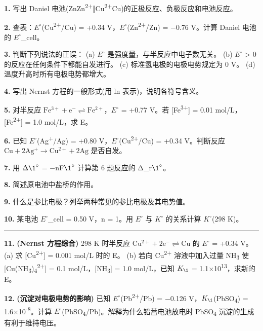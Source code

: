 \documentclass[a4paper,11pt]{ctexart}
\newcommand{\箭}{\ensuremath{\rightarrow}}
\newcommand{\左箭}{\ensuremath{\leftarrow}}
\newcommand{\上箭}{\ensuremath{\uparrow}}
\newcommand{\下箭}{\ensuremath{\downarrow}}
\newcommand{\衡}{\ensuremath{\rightleftharpoons}}
\newcommand{\双箭}{\ensuremath{\leftrightarrow}}
\newcommand{\约等于}{\ensuremath{\approx}}
\newcommand{\小于等于}{\ensuremath{\leq}}
\newcommand{\大于等于}{\ensuremath{\geq}}
\newcommand{\不等于}{\ensuremath{\neq}}
\newcommand{\西格马}{\ensuremath{\sigma}}
\newcommand{\派}{\ensuremath{\pi}}
\begin{document}
\textbf{1.} 写出 Daniel 电池(Zn\textbar Zn\textsuperscript{2+}‖Cu\textsuperscript{2+}\textbar Cu)的正极反应、负极反应和电池反应。

\textbf{2.} 查表：\(E^{\circ}\)(Cu\textsuperscript{2+}/Cu) = +0.34 V，\(E^{\circ}\)(Zn\textsuperscript{2+}/Zn) = −0.76 V。计算 Daniel 电池的 \(E^{\circ}\)\_cell。

\textbf{3.} 判断下列说法的正误：
(a) \(E^{\circ}\) 是强度量，与半反应中电子数无关。
(b) \(E^{\circ}\) \textgreater{} 0 的反应在任何条件下都能自发进行。
(c) 标准氢电极的电极电势规定为 0 V。
(d) 温度升高时所有电极电势都增大。

\textbf{4.} 写出 Nernst 方程的一般形式(用 ln 表示)，说明各符号含义。

\textbf{5.} 对半反应 \(\mathrm{Fe^{3+} + e^- \rightleftharpoons Fe^{2+}}\)，\(E^{\circ}\) = +0.77 V。若 {[}Fe\textsuperscript{3+}{]} = 0.01 mol/L，{[}Fe\textsuperscript{2+}{]} = 1.0 mol/L，求 E。

\textbf{6.} 已知 \(E^{\circ}\)(Ag\textsuperscript{+}/Ag) = +0.80 V，\(E^{\circ}\)(Cu\textsuperscript{2+}/Cu) = +0.34 V。判断反应 \(\mathrm{Cu + 2Ag^+ \to Cu^{2+} + 2Ag}\) 是否自发。

\textbf{7.} 用 \(\Delta \1^{\circ}\) = −nF\(\1^{\circ}\) 计算第 6 题反应的 Δ\_r\(\1^{\circ}\)。

\textbf{8.} 简述原电池中盐桥的作用。

\textbf{9.} 什么是参比电极？列举两种常见的参比电极及其电势值。

\textbf{10.} 某电池 \(E^{\circ}\)\_cell = 0.50 V，n = 1。用 \(E^{\circ}\) 与 \(K^{\circ}\) 的关系计算 \(K^{\circ}\)(298 K)。

\begin{center}\rule{0.5\linewidth}{0.5pt}\end{center}

\textbf{11.} \textbf{(Nernst 方程综合)} 298 K 时半反应 \(\mathrm{Cu^{2+} + 2e^- \rightleftharpoons Cu}\) 的 \(E^{\circ}\) = +0.34 V。
(a) 求 {[}Cu\textsuperscript{2+}{]} = 0.001 mol/L 时的 E。
(b) 若向 Cu\textsuperscript{2+} 溶液中加入过量 NH\textsubscript{3} 使 {[}Cu(NH\textsubscript{3})\textsubscript{4}\textsuperscript{2+}{]} = 0.1 mol/L，{[}NH\textsubscript{3}{]} = 1.0 mol/L，已知 \(K_{\1}\) = 1.1×10\textsuperscript{13}，求新的 E。

\textbf{12.} \textbf{(沉淀对电极电势的影响)} 已知 \(E^{\circ}\)(Pb\textsuperscript{2+}/Pb) = −0.126 V，\(K_{\1}\)(PbSO\textsubscript{4}) = 1.6×10\textsuperscript{-8}。计算 \(E^{\circ}\)(PbSO\textsubscript{4}/Pb)。解释为什么铅蓄电池放电时 PbSO\textsubscript{4} 沉淀的生成有利于维持电压。
\end{document}
